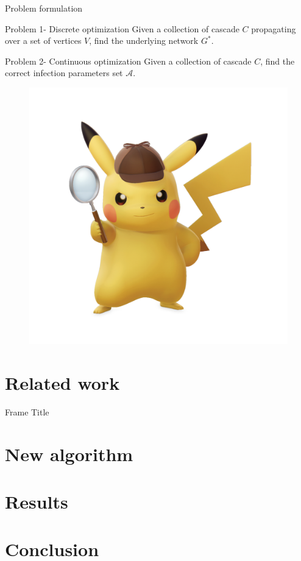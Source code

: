 \documentclass{beamer}
\begin{document}
\begin{frame}{Problem formulation}
\begin{block}{Problem 1- Discrete optimization}
Given a collection of cascade $C$ propagating over a set of vertices $V$, find the underlying network $G^*$.
\end{block}
\begin{block}{Problem 2- Continuous optimization}
Given a collection of cascade $C$, find the correct infection parameters set $\mathscr{A}$.  
\end{block}
\begin{figure}
    \centering
    \includegraphics[scale = 0.1]{Detective_Pikachu_-_Character_artwork_01.png}
\end{figure}
\end{frame}

\section{Related work}
\begin{frame}{Frame Title}
    
\end{frame}
\section{New algorithm}
\section{Results}
\section{Conclusion}
\end{document}

